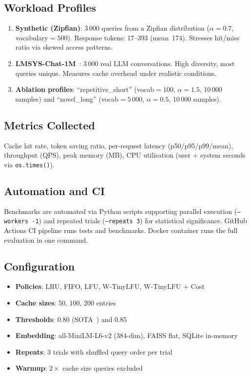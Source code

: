 \documentclass[11pt,a4paper]{article}
\begin{document}
\subsection{Workload Profiles}

\begin{enumerate}
  \item \textbf{Synthetic (Zipfian)}: 3\,000 queries from a Zipfian distribution ($\alpha=0.7$, vocabulary${}=500$).
  Response tokens: 17--393 (mean~174).
  Stresses hit/miss ratio via skewed access patterns.

  \item \textbf{LMSYS-Chat-1M}~\cite{lmsys}: 3\,000 real LLM conversations.
  High diversity, most queries unique.
  Measures cache overhead under realistic conditions.

  \item \textbf{Ablation profiles}: ``repetitive\_short'' (vocab${}=100$, $\alpha=1.5$, 10\,000 samples) and ``novel\_long'' (vocab${}=5\,000$, $\alpha=0.5$, 10\,000 samples).
\end{enumerate}

\subsection{Metrics Collected}

Cache hit rate, token saving ratio, per-request latency (p50/p95/p99/mean), throughput (QPS), peak memory (MB), CPU utilisation (user + system seconds via \texttt{os.times()}).

\subsection{Automation and CI}

Benchmarks are automated via Python scripts supporting parallel execution (\texttt{--workers~-1}) and repeated trials (\texttt{--repeats~3}) for statistical significance.
GitHub Actions CI pipeline runs tests and benchmarks.
Docker container runs the full evaluation in one command.

\subsection{Configuration}

\begin{itemize}[nosep]
  \item \textbf{Policies}: LRU, FIFO, LFU, W-TinyLFU, W-TinyLFU + Cost
  \item \textbf{Cache sizes}: 50, 100, 200 entries
  \item \textbf{Thresholds}: 0.80 (SOTA~\cite{gptsemcache}) and 0.85
  \item \textbf{Embedding}: all-MiniLM-L6-v2 (384-dim), FAISS flat, SQLite in-memory
  \item \textbf{Repeats}: 3 trials with shuffled query order per trial
  \item \textbf{Warmup}: $2\times$ cache size queries excluded
\end{itemize}
\end{document}
